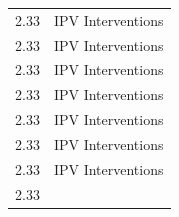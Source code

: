 \documentclass[]{tufte-handout}
\begin{document}
\begin{longtable}[]{@{}ll@{}}
\begin{minipage}[t]{0.09\columnwidth}
2.33\strut
\end{minipage} & \begin{minipage}[t]{0.26\columnwidth}\raggedright\strut
IPV Interventions\strut
\end{minipage}\tabularnewline
\begin{minipage}[t]{0.09\columnwidth}\raggedright\strut
2.33\strut
\end{minipage} & \begin{minipage}[t]{0.26\columnwidth}\raggedright\strut
IPV Interventions\strut
\end{minipage}\tabularnewline
\begin{minipage}[t]{0.09\columnwidth}\raggedright\strut
2.33\strut
\end{minipage} & \begin{minipage}[t]{0.26\columnwidth}\raggedright\strut
IPV Interventions\strut
\end{minipage}\tabularnewline
\begin{minipage}[t]{0.09\columnwidth}\raggedright\strut
2.33\strut
\end{minipage} & \begin{minipage}[t]{0.26\columnwidth}\raggedright\strut
IPV Interventions\strut
\end{minipage}\tabularnewline
\begin{minipage}[t]{0.09\columnwidth}\raggedright\strut
2.33\strut
\end{minipage} & \begin{minipage}[t]{0.26\columnwidth}\raggedright\strut
IPV Interventions\strut
\end{minipage}\tabularnewline
\begin{minipage}[t]{0.09\columnwidth}\raggedright\strut
2.33\strut
\end{minipage} & \begin{minipage}[t]{0.26\columnwidth}\raggedright\strut
IPV Interventions\strut
\end{minipage}\tabularnewline
\begin{minipage}[t]{0.09\columnwidth}\raggedright\strut
2.33\strut
\end{minipage} & \begin{minipage}[t]{0.26\columnwidth}\raggedright\strut
IPV Interventions\strut
\end{minipage}\tabularnewline
\begin{minipage}[t]{0.09\columnwidth}\raggedright\strut
2.33\strut
\end{minipage} & \begin{minipage}[t]{0.26\columnwidth}\raggedright\strut

\end{minipage}
\end{longtable}
\end{document}
